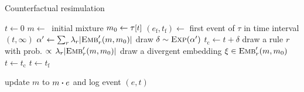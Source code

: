 \newcommand{\EVF}[0]{e_{\text{f}}}
\newcommand{\EVCF}[0]{e_{\text{c}}}

\renewcommand{\algorithmicrequire}{\textbf{Input:}}
\renewcommand{\algorithmicensure}{\textbf{Output:}}

\begin{algorithm}[h]
\caption{Counterfactual resimulation}\label{alg:cosimulation}
\begin{spacing}{  \fi}
\begin{algorithmic}[1]
\vspace{0.2cm}
\STATE $t \gets 0$
\STATE $m \gets\ $ initial mixture
  \STATE $m_0 \gets \TSTATE{t}{\tau}$
  \STATE $(\EVF{}, t_{\text{f}}) \gets $ first event of $\tau$ in time interval $(t, \infty)$
  \vspace{0.1cm}
  \STATE $\alpha' \gets \sum_r {\lambda_r |{\textsc{Emb}}'_{r}(m, m_0)|}$
  \vspace{0.1cm}
  \STATE draw $\delta \sim \textsc{Exp}(\alpha') $
  \STATE $t_{\text{c}} \gets t + \delta$
   \label{cosim:cev}
      \STATE draw a rule $r$ with prob.
      $\propto \, \lambda_r |{\textsc{Emb}}'_{r}(m, m_0)|$
      \STATE  draw a divergent embedding $\xi \in {\textsc{Emb}}'_{r}(m, m_0)$
      \STATE $t \gets t_{\text{c}}$
  \ELSE
      \STATE {$e \gets \EVF{}$}
      \STATE $t \gets t_{\text{f}}$
  \ENDIF

      \STATE update $m$ to $\UPDATE{m}{e}$ and log event $(e, t)$
  \ENDIF
\ENDWHILE
\vspace{0.1cm}
\end{algorithmic}
\end{spacing}
\end{algorithm}